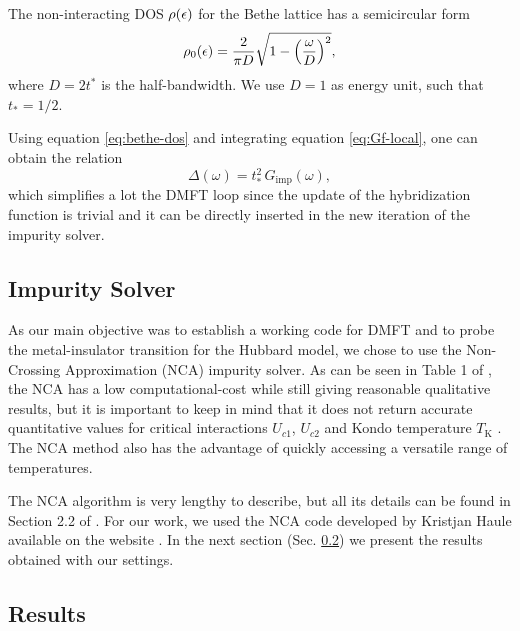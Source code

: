 \documentclass[12pt]{report}
\begin{document}
The non-interacting DOS $\rho(\epsilon)$ for the Bethe lattice has a semicircular form \cite{georges1996}
\begin{equation} \label{eq:bethe-dos}
\rho_0(\epsilon) = \frac{2}{\pi D} \sqrt{1-\qty(\frac{\omega}{D})^2},
\end{equation}
where $D = 2t^*$ is the half-bandwidth. We use $D = 1$ as energy unit, such that $t_* = 1/2$.


Using equation \ref{eq:bethe-dos} and integrating equation \ref{eq:Gf-local}, one can obtain the relation \cite{thesis_bruno}
\begin{equation} \label{eq:simple-hybridization-bethe}
\Delta(\omega) = t_*^2 \, G_{\text{imp}}(\omega),
\end{equation}
which simplifies a lot the DMFT loop since the update of the hybridization function is trivial and it can be directly inserted in the new iteration of the impurity solver.

\subsection{Impurity Solver} \label{sec:impurity-solver}

As our main objective was to establish a working code for DMFT and to probe the metal-insulator transition for the Hubbard model, we chose to use the Non-Crossing Approximation (NCA) impurity solver. As can be seen in Table 1 of \cite{impurity-solvers}, the NCA has a low computational-cost while still giving reasonable qualitative results, but it is important to keep in mind that it does not return accurate quantitative values for critical interactions $U_{c1}$, $U_{c2}$ and Kondo temperature $T_{\text{K}}$ \cite{haule_real_materials, vildosola2015}. The NCA method also has the advantage of quickly accessing a versatile range of temperatures.

The NCA algorithm is very lengthy to describe, but all its details can be found in Section 2.2 of \cite{thesis_bruno}. For our work, we used the NCA code developed by Kristjan Haule available on the website \cite{hauleweb}. In the next section (Sec. \ref{sec:results}) we present the results obtained with our settings.

\subsection{Results} \label{sec:results}
\end{document}
